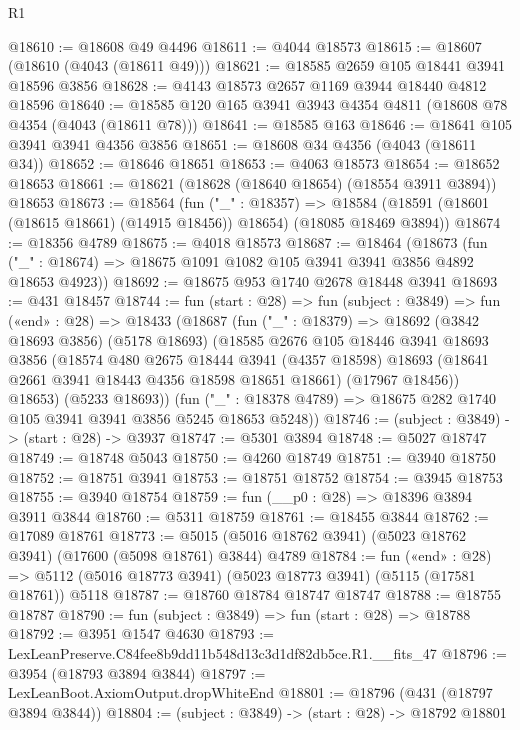 \begin{lexlean}{R1}
\begin{coremodule}
@18610 := @18608 @49 @4496
@18611 := @4044 @18573
@18615 := @18607 (@18610 (@4043 (@18611 @49)))
@18621 := @18585 @2659 @105 @18441 @3941 @18596 @3856
@18628 := @4143 @18573 @2657 @1169 @3944 @18440 @4812 @18596
@18640 := @18585 @120 @165 @3941 @3943 @4354 @4811 (@18608 @78 @4354 (@4043 (@18611 @78)))
@18641 := @18585 @163
@18646 := @18641 @105 @3941 @3941 @4356 @3856
@18651 := @18608 @34 @4356 (@4043 (@18611 @34))
@18652 := @18646 @18651
@18653 := @4063 @18573
@18654 := @18652 @18653
@18661 := @18621 (@18628 (@18640 @18654) (@18554 @3911 @3894)) @18653
@18673 := @18564
    (fun ("_" : @18357) =>
    @18584 (@18591 (@18601 (@18615 @18661) (@14915 @18456)) @18654) (@18085 @18469 @3894))
@18674 := @18356 @4789
@18675 := @4018 @18573
@18687 := @18464
    (@18673 (fun ("_" : @18674) => @18675 @1091 @1082 @105 @3941 @3941 @3856 @4892 @18653 @4923))
@18692 := @18675 @953 @1740 @2678 @18448 @3941
@18693 := @431 @18457
@18744 := fun (start : @28) =>
  fun (subject : @3849) =>
  fun («end» : @28) =>
  @18433
    (@18687
      (fun ("_" : @18379) =>
      @18692
        (@3842 @18693 @3856)
        (@5178 @18693)
        (@18585
          @2676
          @105
          @18446
          @3941
          @18693
          @3856
          (@18574
            @480
            @2675
            @18444
            @3941
            (@4357 @18598)
            @18693
            (@18641 @2661 @3941 @18443 @4356 @18598 @18651 @18661)
            (@17967 @18456))
          @18653)
        (@5233 @18693))
      (fun ("_" : @18378 @4789) => @18675 @282 @1740 @105 @3941 @3941 @3856 @5245 @18653 @5248))
@18746 := (subject : @3849) -> (start : @28) -> @3937
@18747 := @5301 @3894
@18748 := @5027 @18747
@18749 := @18748 @5043
@18750 := @4260 @18749
@18751 := @3940 @18750
@18752 := @18751 @3941
@18753 := @18751 @18752
@18754 := @3945 @18753
@18755 := @3940 @18754
@18759 := fun (__p0 : @28) => @18396 @3894 @3911 @3844
@18760 := @5311 @18759
@18761 := @18455 @3844
@18762 := @17089 @18761
@18773 := @5015 (@5016 @18762 @3941) (@5023 @18762 @3941) (@17600 (@5098 @18761) @3844) @4789
@18784 := fun («end» : @28) =>
  @5112 (@5016 @18773 @3941) (@5023 @18773 @3941) (@5115 (@17581 @18761)) @5118
@18787 := @18760 @18784 @18747 @18747
@18788 := @18755 @18787
@18790 := fun (subject : @3849) => fun (start : @28) => @18788
@18792 := @3951 @1547 @4630
@18793 := LexLeanPreserve.C84fee8b9dd11b548d13c3d1df82db5ce.R1.__fits_47
@18796 := @3954 (@18793 @3894 @3844)
@18797 := LexLeanBoot.AxiomOutput.dropWhiteEnd
@18801 := @18796 (@431 (@18797 @3894 @3844))
@18804 := (subject : @3849) -> (start : @28) -> @18792 @18801

\end{coremodule}
\end{lexlean}
